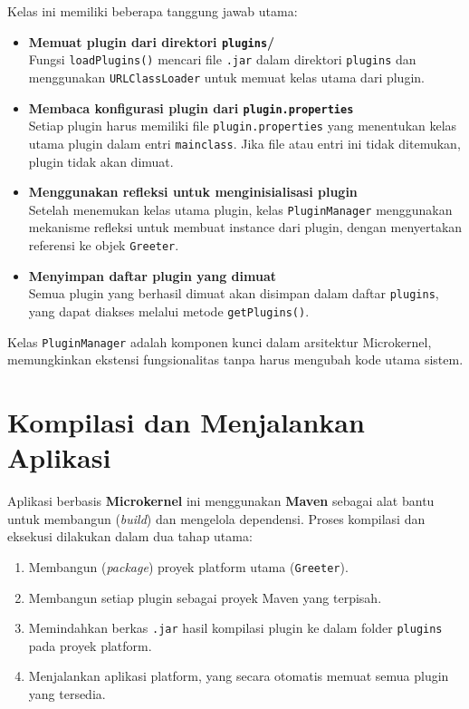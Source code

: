 Kelas ini memiliki beberapa tanggung jawab utama:

\begin{itemize}
	\item \textbf{Memuat plugin dari direktori \texttt{plugins}/} \\
	Fungsi \texttt{loadPlugins()} mencari file \texttt{.jar} dalam direktori \texttt{plugins} dan menggunakan \texttt{URLClassLoader} untuk memuat kelas utama dari plugin.
	
	\item \textbf{Membaca konfigurasi plugin dari \texttt{plugin.properties}} \\
	Setiap plugin harus memiliki file \texttt{plugin.properties} yang menentukan kelas utama plugin dalam entri \texttt{mainclass}. Jika file atau entri ini tidak ditemukan, plugin tidak akan dimuat.
	
	\item \textbf{Menggunakan refleksi untuk menginisialisasi plugin} \\
	Setelah menemukan kelas utama plugin, kelas \texttt{PluginManager} menggunakan mekanisme refleksi untuk membuat instance dari plugin, dengan menyertakan referensi ke objek \texttt{Greeter}.
	
	\item \textbf{Menyimpan daftar plugin yang dimuat} \\
	Semua plugin yang berhasil dimuat akan disimpan dalam daftar \texttt{plugins}, yang dapat diakses melalui metode \texttt{getPlugins()}.
\end{itemize}

Kelas \texttt{PluginManager} adalah komponen kunci dalam arsitektur Microkernel, memungkinkan ekstensi fungsionalitas tanpa harus mengubah kode utama sistem.

\section{Kompilasi dan Menjalankan Aplikasi}

Aplikasi berbasis \textbf{Microkernel} ini menggunakan \textbf{Maven} sebagai alat bantu untuk membangun (\textit{build}) dan mengelola dependensi. Proses kompilasi dan eksekusi dilakukan dalam dua tahap utama:

\begin{enumerate}
	\item Membangun (\textit{package}) proyek platform utama (\texttt{Greeter}).
	\item Membangun setiap plugin sebagai proyek Maven yang terpisah.
	\item Memindahkan berkas \texttt{.jar} hasil kompilasi plugin ke dalam folder \texttt{plugins} pada proyek platform.
	\item Menjalankan aplikasi platform, yang secara otomatis memuat semua plugin yang tersedia.
\end{enumerate}

